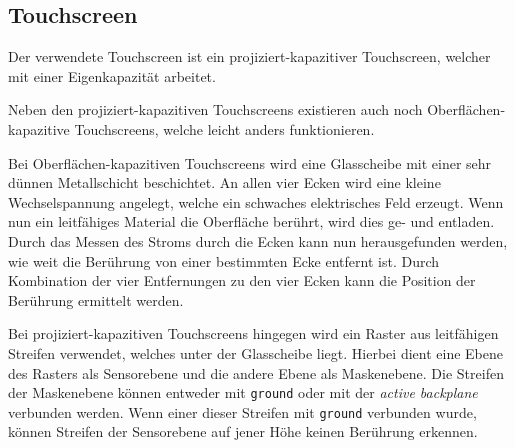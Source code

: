 \subsection{Touchscreen}

Der verwendete Touchscreen ist ein projiziert-kapazitiver Touchscreen, welcher mit einer Eigenkapazität arbeitet. \cite{ts-userManual}

Neben den projiziert-kapazitiven Touchscreens existieren auch noch Oberflächen-kapazitive Touchscreens, welche leicht anders funktionieren.

Bei Oberflächen-kapazitiven Touchscreens wird eine Glasscheibe mit einer sehr dünnen Metallschicht beschichtet.
An allen vier Ecken wird eine kleine Wechselspannung angelegt, welche ein schwaches elektrisches Feld erzeugt.
Wenn nun ein leitfähiges Material die Oberfläche berührt, wird dies ge- und entladen.
Durch das Messen des Stroms durch die Ecken kann nun herausgefunden werden, wie weit die Berührung von einer bestimmten Ecke entfernt ist.
Durch Kombination der vier Entfernungen zu den vier Ecken kann die Position der Berührung ermittelt werden.
\cite{ts-holzinger}

Bei projiziert-kapazitiven Touchscreens hingegen wird ein Raster aus leitfähigen Streifen verwendet, welches unter der Glasscheibe liegt.
Hierbei dient eine Ebene des Rasters als Sensorebene und die andere Ebene als Maskenebene.
Die Streifen der Maskenebene können entweder mit \texttt{ground} oder mit der \textit{active backplane} verbunden werden.
Wenn einer dieser Streifen mit \texttt{ground} verbunden wurde, können Streifen der Sensorebene auf jener Höhe keinen Berührung erkennen.
\cite{ts-self_capacitive_multitouch}
